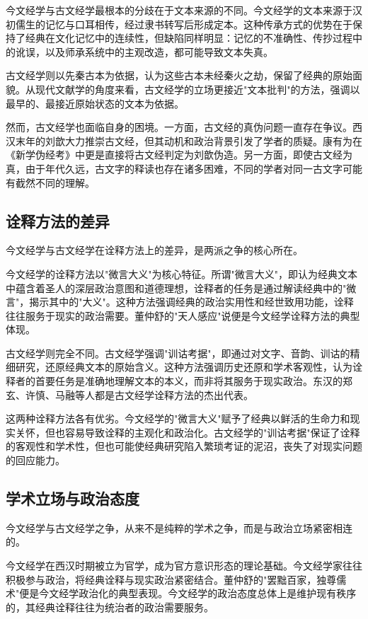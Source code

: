 \documentclass[12pt,a4paper]{article}
\begin{document}
今文经学与古文经学最根本的分歧在于文本来源的不同。今文经学的文本来源于汉初儒生的记忆与口耳相传，经过隶书转写后形成定本。这种传承方式的优势在于保持了经典在文化记忆中的连续性，但缺陷同样明显：记忆的不准确性、传抄过程中的讹误，以及师承系统中的主观改造，都可能导致文本失真。

古文经学则以先秦古本为依据，认为这些古本未经秦火之劫，保留了经典的原始面貌。从现代文献学的角度来看，古文经学的立场更接近"文本批判"的方法，强调以最早的、最接近原始状态的文本为依据。

然而，古文经学也面临自身的困境。一方面，古文经的真伪问题一直存在争议。西汉末年的刘歆大力推崇古文经，但其动机和政治背景引发了学者的质疑。康有为在《新学伪经考》中更是直接将古文经判定为刘歆伪造。另一方面，即使古文经为真，由于年代久远，古文字的释读也存在诸多困难，不同的学者对同一古文字可能有截然不同的理解。

\subsection{诠释方法的差异}

今文经学与古文经学在诠释方法上的差异，是两派之争的核心所在。

今文经学的诠释方法以"微言大义"为核心特征。所谓"微言大义"，即认为经典文本中蕴含着圣人的深层政治意图和道德理想，诠释者的任务是通过解读经典中的"微言"，揭示其中的"大义"。这种方法强调经典的政治实用性和经世致用功能，诠释往往服务于现实的政治需要。董仲舒的"天人感应"说便是今文经学诠释方法的典型体现。

古文经学则完全不同。古文经学强调"训诂考据"，即通过对文字、音韵、训诂的精细研究，还原经典文本的原始含义。这种方法强调历史还原和学术客观性，认为诠释者的首要任务是准确地理解文本的本义，而非将其服务于现实政治。东汉的郑玄、许慎、马融等人都是古文经学诠释方法的杰出代表。

这两种诠释方法各有优劣。今文经学的"微言大义"赋予了经典以鲜活的生命力和现实关怀，但也容易导致诠释的主观化和政治化。古文经学的"训诂考据"保证了诠释的客观性和学术性，但也可能使经典研究陷入繁琐考证的泥沼，丧失了对现实问题的回应能力。

\subsection{学术立场与政治态度}

今文经学与古文经学之争，从来不是纯粹的学术之争，而是与政治立场紧密相连的。

今文经学在西汉时期被立为官学，成为官方意识形态的理论基础。今文经学家往往积极参与政治，将经典诠释与现实政治紧密结合。董仲舒的"罢黜百家，独尊儒术"便是今文经学政治化的典型表现。今文经学的政治态度总体上是维护现有秩序的，其经典诠释往往为统治者的政治需要服务。
\end{document}
